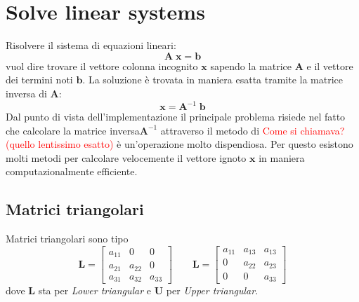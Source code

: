 \documentclass[10pt]{article}
\begin{document}
\section{Solve linear systems}

Risolvere il sistema di equazioni lineari:
\begin{equation}
\mathbf{A} \; \mathbf{x} = \mathbf{b}
\label{eq:lin_sys}
\end{equation}
vuol dire trovare il vettore colonna incognito $\mathbf{x}$ sapendo la matrice $\mathbf{A}$ e il vettore dei termini noti $\mathbf{b}$. La soluzione è trovata in maniera esatta tramite la matrice inversa di $\mathbf{A}$:
\begin{equation}
\mathbf{x} = \mathbf{A}^{-1} \; \mathbf{b}
\end{equation}
Dal punto di vista dell'implementazione il principale problema risiede nel fatto che calcolare la matrice inversa$\mathbf{A}^{-1}$ attraverso il metodo di \textcolor{red}{Come si chiamava? (quello lentissimo esatto)} è un'operazione molto dispendiosa.
Per questo esistono molti metodi per calcolare velocemente il vettore ignoto $\mathbf{x}$ in maniera computazionalmente efficiente.


\subsection{Matrici triangolari}

Matrici triangolari sono tipo
$$
\mathbf{L} = 
\begin{bmatrix}
a_{11} & 0 & 0 \\
a_{21} & a_{22} & 0 \\
a_{31} & a_{32} & a_{33}
\end{bmatrix}
\qquad
\mathbf{L} = 
\begin{bmatrix}
a_{11} & a_{13} & a_{13} \\
0 & a_{22} & a_{23} \\
0 & 0 & a_{33}
\end{bmatrix}
$$
dove $\mathbf{L}$ sta per \textit{Lower triangular} e $\mathbf{U}$ per \textit{Upper triangular}.
\end{document}
